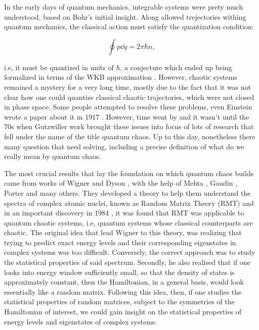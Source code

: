 \documentclass[11pt,a4paper]{article}
\begin{document}
In the early days of quantum mechanics, integrable systems were prety much understood, based on Bohr's initial insight. Along allowed trejectories withing quantum mechanics, the classical action must satisfy the quantization condition:

\begin{equation}
    \oint p\dd q =2\pi\hbar n,
\end{equation}

i.e, it must be quantized in units of $\hbar$, a conjecture which ended up being formalized in terms of the WKB approximation \cite{wentzel_verallgemeinerung_1926,kramers_wellenmechanik_1926,Brillouin:1926blg}. However, chaotic systems remained a mystery for a very long time, mostly due to the fact that it was not clear how one could quantize classical chaotic trajectories, which were not closed in phase space. Some people attempted to resolve these problems, even Einstein wrote a paper about it in 1917 \cite{stone_einsteins_2005}. However, time went by and it wasn't until the 70s when Gutzwiller work \cite{gutzwiller_periodic_1971} brought these issues into focus of lots of research that fell under the name of the title quantum chaos. Up to this day, nonetheless there many question that need solving, including a precise definition of what do we really mean by quantum chaos.

The most crucial results that lay the foundation on which quantum chaos builds came from works of Wigner and Dyson \cite{wigner_statistical_1951,wigner_characteristic_1955,wigner_characteristics_1957,wigner_distribution_1958,dyson_statistical_1962}, with the help of Mehta \cite{mehta_statistical_1960}, Gaudin \cite{mehta_density_1960}, Porter \cite{porter_statistical_1965} and many others. They developed a theory to help them understand the spectra of complex atomic nuclei, known as Random Matrix Theory (RMT) and in an important discovery in 1984 \cite{bohigas_characterization_1984}, it was found that RMT was applicable to quantum chaotic systems, i.e, quantum systems whose classical counterparts are chaotic.
The original idea that lead Wigner to this theory, was realizing that trying to predict exact energy levels and their corresponding eigenstates in complex systems was too difficult. Conversely, the correct approach was to study the statistical properties of said spectrum. Secondly, he also realised that if one looks into energy window sufficiently small, so that the density of states is approximately constant, then the Hamiltonian, in a general basis, would look essentially like a random matrix. Following this idea, then, if one studies the statistical properties of random matrices, subject to the symmetries of the Hamiltonian of interest, we could gain insight on the statistical properties of energy levels and eigenstates of complex systems.
\end{document}
